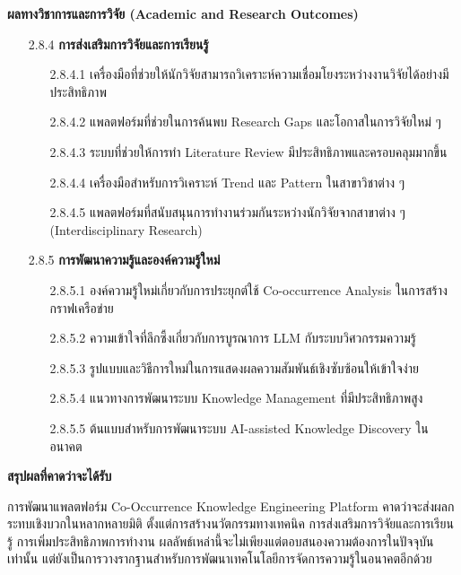 \documentclass[12pt,a4paper]{article}
\begin{document}
\begin{enumerate}[leftmargin=2cm]
{        \vspace{0.2cm}

        \textbf{ผลทางวิชาการและการวิจัย (Academic and Research Outcomes)}

        \begin{enumerate}
            \item[2.8.4] \textbf{การส่งเสริมการวิจัยและการเรียนรู้}
            \begin{enumerate}
                \item[2.8.4.1] เครื่องมือที่ช่วยให้นักวิจัยสามารถวิเคราะห์ความเชื่อมโยงระหว่างงานวิจัยได้อย่างมีประสิทธิภาพ
                \item[2.8.4.2] แพลตฟอร์มที่ช่วยในการค้นพบ Research Gaps และโอกาสในการวิจัยใหม่ ๆ
                \item[2.8.4.3] ระบบที่ช่วยให้การทำ Literature Review มีประสิทธิภาพและครอบคลุมมากขึ้น
                \item[2.8.4.4] เครื่องมือสำหรับการวิเคราะห์ Trend และ Pattern ในสาขาวิชาต่าง ๆ
                \item[2.8.4.5] แพลตฟอร์มที่สนับสนุนการทำงานร่วมกันระหว่างนักวิจัยจากสาขาต่าง ๆ (Interdisciplinary Research)
            \end{enumerate}

            \item[2.8.5] \textbf{การพัฒนาความรู้และองค์ความรู้ใหม่}
            \begin{enumerate}
                \item[2.8.5.1] องค์ความรู้ใหม่เกี่ยวกับการประยุกต์ใช้ Co-occurrence Analysis ในการสร้างกราฟเครือข่าย
                \item[2.8.5.2] ความเข้าใจที่ลึกซึ้งเกี่ยวกับการบูรณาการ LLM กับระบบวิศวกรรมความรู้
                \item[2.8.5.3] รูปแบบและวิธีการใหม่ในการแสดงผลความสัมพันธ์เชิงซับซ้อนให้เข้าใจง่าย
                \item[2.8.5.4] แนวทางการพัฒนาระบบ Knowledge Management ที่มีประสิทธิภาพสูง
                \item[2.8.5.5] ต้นแบบสำหรับการพัฒนาระบบ AI-assisted Knowledge Discovery ในอนาคต
            \end{enumerate}
        \end{enumerate}

        \vspace{0.8cm}

        \textbf{สรุปผลที่คาดว่าจะได้รับ}

        \hspace{1cm}การพัฒนาแพลตฟอร์ม Co-Occurrence Knowledge Engineering Platform คาดว่าจะส่งผลกระทบเชิงบวกในหลากหลายมิติ ตั้งแต่การสร้างนวัตกรรมทางเทคนิค การส่งเสริมการวิจัยและการเรียนรู้ การเพิ่มประสิทธิภาพการทำงาน ผลลัพธ์เหล่านี้จะไม่เพียงแต่ตอบสนองความต้องการในปัจจุบันเท่านั้น แต่ยังเป็นการวางรากฐานสำหรับการพัฒนาเทคโนโลยีการจัดการความรู้ในอนาคตอีกด้วย
    }


\end{enumerate}
\end{document}
